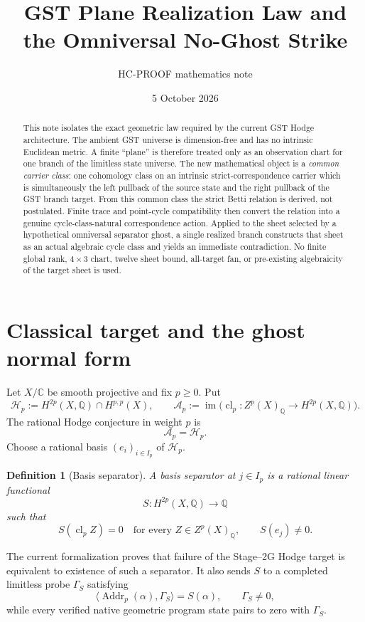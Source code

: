 \documentclass[11pt]{article}
\title{GST Plane Realization Law and the Omniversal No-Ghost Strike}
\author{HC-PROOF mathematics note}
\date{5 October 2026}
\newtheorem{definition}{Definition}[section]
\newcommand{\Q}{\mathbb{Q}}
\newcommand{\C}{\mathbb{C}}
\newcommand{\cl}{\operatorname{cl}}
\newcommand{\im}{\operatorname{im}}
\newcommand{\Alg}{\mathcal{A}}
\newcommand{\Hdg}{\mathcal{H}}
\newcommand{\Addr}{\operatorname{Addr}}
\begin{document}
\maketitle

\begin{abstract}
This note isolates the exact geometric law required by the current GST Hodge
architecture.  The ambient GST universe is dimension-free and has no intrinsic
Euclidean metric.  A finite ``plane'' is therefore treated only as an
observation chart for one branch of the limitless state universe.  The new
mathematical object is a \emph{common carrier class}: one cohomology class on
an intrinsic strict-correspondence carrier which is simultaneously the left
pullback of the source state and the right pullback of the GST branch target.
From this common class the strict Betti relation is derived, not postulated.
Finite trace and point-cycle compatibility then convert the relation into a
genuine cycle-class-natural correspondence action.  Applied to the sheet
selected by a hypothetical omniversal separator ghost, a single realized
branch constructs that sheet as an actual algebraic cycle class and yields an
immediate contradiction.  No finite global rank, $4\times 3$ chart, twelve
sheet bound, all-target fan, or pre-existing algebraicity of the target sheet
is used.
\end{abstract}

\section{Classical target and the ghost normal form}

Let $X/\C$ be smooth projective and fix $p\ge 0$.  Put
\[
  \Hdg_p := H^{2p}(X,\Q)\cap H^{p,p}(X),
  \qquad
  \Alg_p := \im\bigl(\cl_p: Z^p(X)_{\Q}\to H^{2p}(X,\Q)\bigr).
\]
The rational Hodge conjecture in weight $p$ is
\[
  \Alg_p = \Hdg_p.
\]
Choose a rational basis $(e_i)_{i\in I_p}$ of $\Hdg_p$.

\begin{definition}[Basis separator]
A basis separator at $j\in I_p$ is a rational linear functional
\[
  S:H^{2p}(X,\Q)\longrightarrow \Q
\]
such that
\[
  S(\cl_p Z)=0\quad\text{for every }Z\in Z^p(X)_{\Q},
  \qquad
  S(e_j)\ne 0.
\]
\end{definition}

The current formalization proves that failure of the Stage--2G Hodge target is
equivalent to existence of such a separator.  It also sends $S$ to a completed
limitless probe $\Gamma_S$ satisfying
\[
 \langle \Addr_p(\alpha),\Gamma_S\rangle=S(\alpha),
 \qquad
 \Gamma_S\ne0,
\]
while every verified native geometric program state pairs to zero with
$\Gamma_S$.
\end{document}
